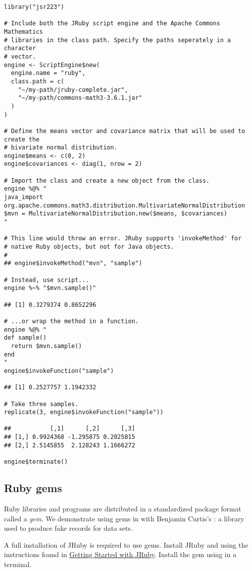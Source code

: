 \begin{verbatim}
library("jsr223")

# Include both the JRuby script engine and the Apache Commons Mathematics
# libraries in the class path. Specify the paths seperately in a character
# vector.
engine <- ScriptEngine$new(
  engine.name = "ruby",
  class.path = c(
    "~/my-path/jruby-complete.jar",
    "~/my-path/commons-math3-3.6.1.jar"
  )
)

# Define the means vector and covariance matrix that will be used to create the
# bivariate normal distribution.
engine$means <- c(0, 2)
engine$covariances <- diag(1, nrow = 2)

# Import the class and create a new object from the class.
engine %@% "
java_import org.apache.commons.math3.distribution.MultivariateNormalDistribution
$mvn = MultivariateNormalDistribution.new($means, $covariances)
"

# This line would throw an error. JRuby supports 'invokeMethod' for
# native Ruby objects, but not for Java objects.
#
## engine$invokeMethod("mvn", "sample")

# Instead, use script...
engine %~% "$mvn.sample()"

## [1] 0.3279374 0.8652296

# ...or wrap the method in a function.
engine %@% "
def sample()
  return $mvn.sample()
end
"
engine$invokeFunction("sample")

## [1] 0.2527757 1.1942332

# Take three samples.
replicate(3, engine$invokeFunction("sample"))

##           [,1]      [,2]      [,3]
## [1,] 0.9924368 -1.295875 0.2025815
## [2,] 2.5145855  2.128243 1.1666272

engine$terminate()
\end{verbatim}

\subsection{Ruby gems}

Ruby libraries and programs are distributed in a standardized package format called a \textit{gem}. We demonstrate using gems in  with Benjamin Curtis's \href{https://github.com/stympy/faker}{}: a library used to produce fake records for data sets. %

A full installation of JRuby is required to use gems. Install JRuby and using the instructions found in \href{https://github.com/jruby/jruby/wiki/GettingStarted}{Getting Started with JRuby}. %
Install the  gem using  in a terminal.

